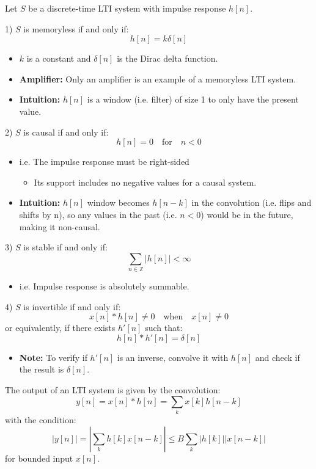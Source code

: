 \begin{theorem}
    Let $S$ be a discrete-time LTI system with impulse response $h[n]$.

    1) $S$ is memoryless if and only if:
    \[
    h[n] = k \delta[n]
    \]
    \begin{itemize}
        \item $k$ is a constant and $\delta[n]$ is the Dirac delta function. 
        \item \textbf{Amplifier:} Only an amplifier is an example of a memoryless LTI system.
        \item \textbf{Intuition:} $h[n]$ is a window (i.e. filter) of size 1 to only have the present value. 
    \end{itemize}
    
    2) $S$ is causal if and only if:
    \[
    h[n] = 0 \quad \text{for} \quad n < 0
    \]
    \begin{itemize}
        \item i.e. The impulse response must be right-sided 
        \begin{itemize}
            \item Its support includes no negative values for a causal system.
        \end{itemize}
        \item \textbf{Intuition:} $h[n]$ window becomes $h[n-k]$ in the convolution (i.e. flips and shifts by n), so any values in the past (i.e. $n<0$) would be in the future, making it non-causal.
    \end{itemize}
    
    3) $S$ is stable if and only if:
    \[
    \sum_{n \in \mathbb{Z}} |h[n]| < \infty
    \]
    \begin{itemize}
        \item i.e. Impulse response is absolutely summable.
    \end{itemize}
    
    4) $S$ is invertible if and only if:
    \[
    x[n] * h[n] \neq 0 \quad \text{when} \quad x[n] \neq 0
    \]
    or equivalently, if there exists $h'[n]$ such that:
    \[
    h[n] * h'[n] = \delta[n]
    \]
    \begin{itemize}
        \item \textbf{Note:} To verify if $h'[n]$ is an inverse, convolve it with $h[n]$ and check if the result is $\delta[n]$.
    \end{itemize}
    \vspace{1em}
    
    The output of an LTI system is given by the convolution:
    \[
    y[n] = x[n] * h[n] = \sum_{k} x[k] h[n - k]
    \]
    with the condition:
    \[
    |y[n]| = \left| \sum_{k} h[k] x[n - k] \right| \leq B \sum_{k} |h[k]| |x[n - k]|
    \]
    for bounded input \(x[n]\).
\end{theorem}